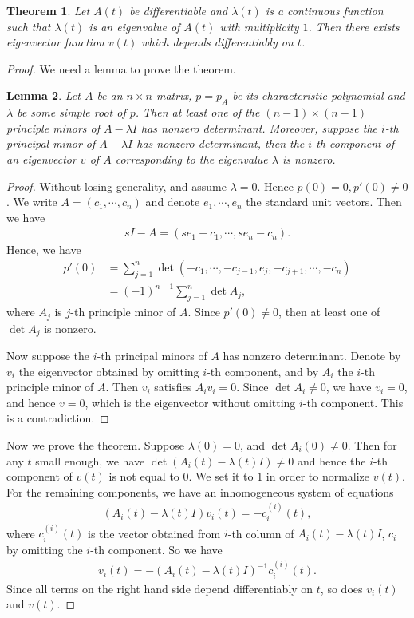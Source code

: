 \documentclass[10pt]{book}
\newtheorem{theorem}{Theorem}[chapter]
\newtheorem{lemma}[theorem]{Lemma}
\theoremstyle{definition}
\numberwithin{equation}{chapter}
\begin{document}
\begin{theorem}
Let $A(t)$ be differentiable and $\lambda(t)$ is a continuous function such that $\lambda(t)$ is an eigenvalue of $A(t)$ with multiplicity $1$. Then there exists eigenvector function $v(t)$ which depends differentiably on $t$. 
\end{theorem}
\begin{proof}
We need a lemma to prove the theorem.
\begin{lemma}
Let $A$ be an $n\times n$ matrix, $p = p_A$ be its characteristic polynomial and $\lambda$ be some simple root of $p$. Then at least one of the $(n-1)\times(n-1)$ principle minors of $A - \lambda I$ has nonzero determinant. Moreover, suppose the $i$-th principal minor of $A - \lambda I$ has nonzero determinant, then the $i$-th component of an eigenvector $v$ of $A$ corresponding to the eigenvalue $\lambda$ is nonzero.
\end{lemma}
\begin{proof}
Without losing generality, and assume $\lambda = 0$. Hence $p(0) = 0, p'(0) \neq 0$. We write $A = (c_1, \cdots, c_n)$ and denote $e_1, \cdots, e_n$ the standard unit vectors. Then we have
\begin{align*}
    s I - A = (se_1 - c_1, \cdots, se_n - c_n).
\end{align*}
Hence, we have
\begin{align*}
    p'(0) & = \sum^n_{j=1} \det (-c_1, \cdots, -c_{j-1}, e_j, -c_{j+1},\cdots, -c_n) \\
    & = (-1)^{n-1} \sum^n_{j=1} \det A_j,
\end{align*}
where $A_j$ is $j$-th principle minor of $A$. Since $p'(0) \neq 0$, then at least one of $\det A_j$ is nonzero.

Now suppose the $i$-th principal minors of $A$ has nonzero determinant. Denote by $v_i$ the eigenvector obtained by omitting $i$-th component, and by $A_i$ the $i$-th principle minor of $A$. Then $v_i$ satisfies $A_i v_i = 0$. Since $\det A_i \neq 0$, we have $v_i = 0$, and hence $v = 0$, which is the eigenvector without omitting $i$-th component. This is a contradiction.
\end{proof}

Now we prove the theorem. Suppose $\lambda(0) = 0$, and $\det A_i(0) \neq 0$. Then for any $t$ small enough, we have $\det (A_i(t) - \lambda(t)I) \neq 0$ and hence the $i$-th component of $v(t)$ is not equal to $0$. We set it to $1$ in order to normalize $v(t)$. For the remaining components, we have an inhomogeneous system of equations 
\begin{align*}
    \left(A_i(t) - \lambda(t)I \right) v_i(t) = - c_i^{(i)}(t),
\end{align*}
where $c_i^{(i)}(t)$ is the vector obtained from $i$-th column of $A_i(t) - \lambda(t)I$, $c_i$ by omitting the $i$-th component. So we have 
\begin{align*}
    v_i(t) = - \left(A_i(t) - \lambda(t)I \right)^{-1} c_i^{(i)}(t).
\end{align*}
Since all terms on the right hand side depend differentiably on $t$, so does $v_i(t)$ and $v(t)$. 
\end{proof}
\end{document}
